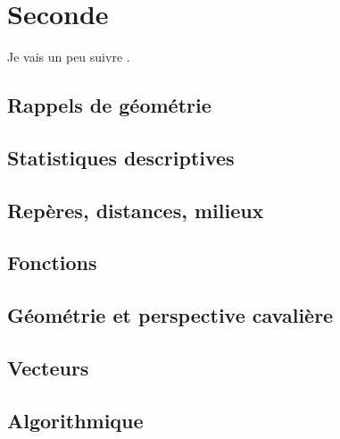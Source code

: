 \documentclass[a4paper,12pt]{book}
\begin{document}




\newpage



\tableofcontents

\newpage

\part{Seconde}

Je vais un peu suivre \cite{oklaEg}.
\setcounter{chapter}{-1}

\chapter{Rappels de géométrie}


\chapter{Statistiques descriptives}




\chapter{Repères, distances, milieux}


\chapter{Fonctions}



\chapter{Géométrie et perspective cavalière}


\chapter{Vecteurs}


\chapter{Algorithmique}

\end{document}
